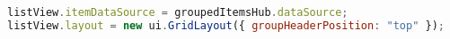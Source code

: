 \begin{lstlisting}[language= Javascript,caption=Setzen der Datenquelle und des Layouts., label={lst:setdatasource}]
listView.itemDataSource = groupedItemsHub.dataSource;
listView.layout = new ui.GridLayout({ groupHeaderPosition: "top" });
\end{lstlisting} 